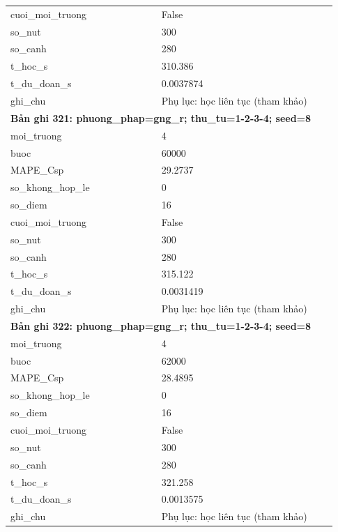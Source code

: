 \begin{longtable}{p{0.43\linewidth}p{0.50\linewidth}}
cuoi\_\allowbreak moi\_\allowbreak truong & False \\
so\_\allowbreak nut & 300 \\
so\_\allowbreak canh & 280 \\
t\_\allowbreak hoc\_\allowbreak s & 310.386 \\
t\_\allowbreak du\_\allowbreak doan\_\allowbreak s & 0.0037874 \\
ghi\_\allowbreak chu & Phụ lục: học liên tục (tham khảo) \\
\midrule
\multicolumn{2}{p{0.95\linewidth}}{\textbf{Bản ghi 321: phuong\_phap=gng\_r; thu\_tu=1-2-3-4; seed=8}} \\
moi\_\allowbreak truong & 4 \\
buoc & 60000 \\
MAPE\_\allowbreak Csp & 29.2737 \\
so\_\allowbreak khong\_\allowbreak hop\_\allowbreak le & 0 \\
so\_\allowbreak diem & 16 \\
cuoi\_\allowbreak moi\_\allowbreak truong & False \\
so\_\allowbreak nut & 300 \\
so\_\allowbreak canh & 280 \\
t\_\allowbreak hoc\_\allowbreak s & 315.122 \\
t\_\allowbreak du\_\allowbreak doan\_\allowbreak s & 0.0031419 \\
ghi\_\allowbreak chu & Phụ lục: học liên tục (tham khảo) \\
\midrule
\multicolumn{2}{p{0.95\linewidth}}{\textbf{Bản ghi 322: phuong\_phap=gng\_r; thu\_tu=1-2-3-4; seed=8}} \\
moi\_\allowbreak truong & 4 \\
buoc & 62000 \\
MAPE\_\allowbreak Csp & 28.4895 \\
so\_\allowbreak khong\_\allowbreak hop\_\allowbreak le & 0 \\
so\_\allowbreak diem & 16 \\
cuoi\_\allowbreak moi\_\allowbreak truong & False \\
so\_\allowbreak nut & 300 \\
so\_\allowbreak canh & 280 \\
t\_\allowbreak hoc\_\allowbreak s & 321.258 \\
t\_\allowbreak du\_\allowbreak doan\_\allowbreak s & 0.0013575 \\
ghi\_\allowbreak chu & Phụ lục: học liên tục (tham khảo) \\

\end{longtable}
